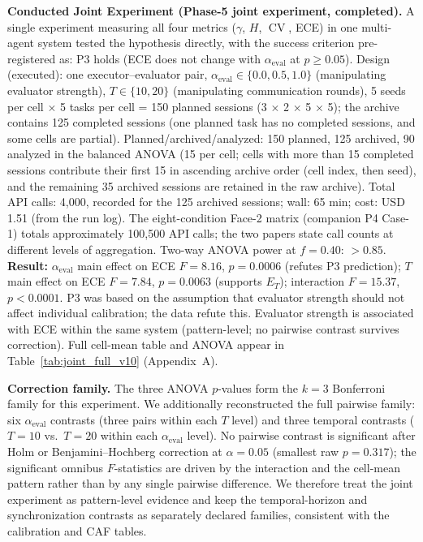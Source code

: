 \documentclass[11pt]{article}
\DeclareMathOperator{\CV}{CV}
\begin{document}
\textbf{Conducted Joint Experiment (Phase-5 joint experiment, completed).} A single experiment measuring all four metrics ($\gamma$, $H$, $\CV$, ECE) in one multi-agent system tested the hypothesis directly, with the success criterion pre-registered as: P3 holds (ECE does not change with $\alpha_{\text{eval}}$ at $p \geq 0.05$). Design (executed): one executor--evaluator pair, $\alpha_{\text{eval}} \in \{0.0, 0.5, 1.0\}$ (manipulating evaluator strength), $T \in \{10, 20\}$ (manipulating communication rounds), 5 seeds per cell $\times$ 5 tasks per cell = 150 planned sessions (3 $\times$ 2 $\times$ 5 $\times$ 5); the archive contains 125 completed sessions (one planned task has no completed sessions, and some cells are partial). Planned/archived/analyzed: 150 planned, 125 archived, 90 analyzed in the balanced ANOVA (15 per cell; cells with more than 15 completed sessions contribute their first 15 in ascending archive order (cell index, then seed), and the remaining 35 archived sessions are retained in the raw archive). Total API calls: 4{,}000, recorded for the 125 archived sessions; wall: 65 min; cost: USD 1.51 (from the run log). The eight-condition Face-2 matrix (companion P4 Case-1) totals approximately 100{,}500 API calls; the two papers state call counts at different levels of aggregation. Two-way ANOVA power at $f = 0.40$: $> 0.85$. \textbf{Result:} $\alpha_{\text{eval}}$ main effect on ECE $F = 8.16$, $p = 0.0006$ (refutes P3 prediction); $T$ main effect on ECE $F = 7.84$, $p = 0.0063$ (supports $E_T$); interaction $F = 15.37$, $p < 0.0001$. P3 was based on the assumption that evaluator strength should not affect individual calibration; the data refute this. Evaluator strength is associated with ECE within the same system (pattern-level; no pairwise contrast survives correction). Full cell-mean table and ANOVA appear in Table~\ref{tab:joint_full_v10} (Appendix~A).

\textbf{Correction family.} The three ANOVA $p$-values form the $k{=}3$ Bonferroni family for this experiment. We additionally reconstructed the full pairwise family: six $\alpha_{\text{eval}}$ contrasts (three pairs within each $T$ level) and three temporal contrasts ($T{=}10$ vs.\ $T{=}20$ within each $\alpha_{\text{eval}}$ level). No pairwise contrast is significant after Holm or Benjamini--Hochberg correction at $\alpha{=}0.05$ (smallest raw $p = 0.317$); the significant omnibus $F$-statistics are driven by the interaction and the cell-mean pattern rather than by any single pairwise difference. We therefore treat the joint experiment as pattern-level evidence and keep the temporal-horizon and synchronization contrasts as separately declared families, consistent with the calibration and CAF tables.
\end{document}
